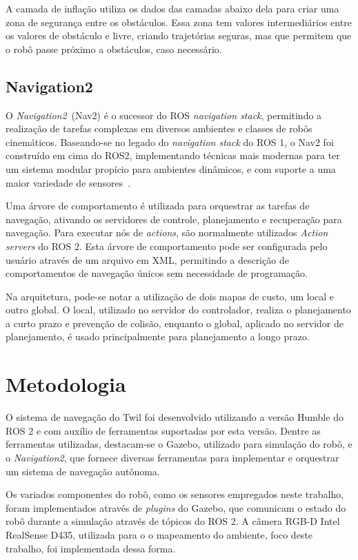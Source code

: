 \documentclass[repeatfields,xlists,xpacks,oneside,yearsonly]{ufrgscca}
\begin{document}
A camada de inflação utiliza os dados das camadas abaixo dela para
criar uma zona de segurança entre os obstáculos. Essa zona tem
valores intermediários entre os valores de obstáculo e livre, criando
trajetórias seguras, mas que permitem que o robô passe próximo a
obstáculos, caso necessário.

\section{Navigation2}

O \textit{Navigation2}~(Nav2) é o sucessor do ROS \textit{navigation
    stack}, permitindo a realização de tarefas complexas em diversos
ambientes e classes de robôs cinemáticos. Baseando-se no legado do
\textit{navigation stack} do ROS 1, o Nav2 foi construído em cima do
ROS2, implementando técnicas mais modernas para ter um sistema
modular propício para ambientes dinâmicos, e com suporte a uma maior
variedade de sensores~\cite{Nav2}.

Uma árvore de comportamento é utilizada para orquestrar as tarefas de
navegação, ativando os servidores de controle, planejamento e
recuperação para navegação. Para executar nós de \textit{actions},
são normalmente utilizados \textit{Action servers} do ROS 2. Esta
árvore de comportamento pode ser configurada pelo usuário através de
um arquivo em XML, permitindo a descrição de comportamentos de
navegação únicos sem necessidade de programação.

Na arquitetura, pode-se notar a utilização de dois mapas de custo, um
local e outro global. O local, utilizado no servidor do controlador,
realiza o planejamento a curto prazo e prevenção de colisão, enquanto
o global, aplicado no servidor de planejamento, é usado
principalmente para planejamento a longo prazo.

\chapter{Metodologia}
\label{desenvolvimento}

O sistema de navegação do Twil foi desenvolvido utilizando a versão
Humble do ROS 2 e com auxílio de ferramentas suportadas por esta
versão. Dentre as ferramentas utilizadas, destacam-se o Gazebo,
utilizado para simulação do robô, e o \textit{Navigation2}, que
fornece diversas ferramentas para implementar e orquestrar um sistema
de navegação autônoma.

Os variados componentes do robô, como os sensores empregados neste
trabalho, foram implementados através de \textit{plugins} do Gazebo,
que comunicam o estado do robô durante a simulação através de tópicos
do ROS 2. A câmera RGB-D Intel RealSense D435, utilizada para o o
mapeamento do ambiente, foco deste trabalho, foi implementada dessa
forma.
\end{document}
